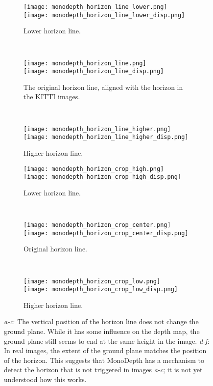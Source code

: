 \begin{figure}
\centering
\begin{subfigure}[t]{0.3\textwidth}
\texttt{[image: monodepth\_horizon\_line\_lower.png]}\\
\texttt{[image: monodepth\_horizon\_line\_lower\_disp.png]}
\caption{Lower horizon line.}
\end{subfigure}
~
\begin{subfigure}[t]{0.3\textwidth}
\texttt{[image: monodepth\_horizon\_line.png]}\\
\texttt{[image: monodepth\_horizon\_line\_disp.png]}
\caption{The original horizon line, aligned with the horizon in the KITTI images.}
\end{subfigure}
~
\begin{subfigure}[t]{0.3\textwidth}
\texttt{[image: monodepth\_horizon\_line\_higher.png]}\\
\texttt{[image: monodepth\_horizon\_line\_higher\_disp.png]}
\caption{Higher horizon line.}
\end{subfigure}

\begin{subfigure}[t]{0.3\textwidth}
\texttt{[image: monodepth\_horizon\_crop\_high.png]}\\
\texttt{[image: monodepth\_horizon\_crop\_high\_disp.png]}
\caption{Lower horizon line.}
\end{subfigure}
~
\begin{subfigure}[t]{0.3\textwidth}
\texttt{[image: monodepth\_horizon\_crop\_center.png]}\\
\texttt{[image: monodepth\_horizon\_crop\_center\_disp.png]}
\caption{Original horizon line.}
\end{subfigure}
~
\begin{subfigure}[t]{0.3\textwidth}
\texttt{[image: monodepth\_horizon\_crop\_low.png]}\\
\texttt{[image: monodepth\_horizon\_crop\_low\_disp.png]}
\caption{Higher horizon line.}
\end{subfigure}
\caption{\emph{a-c}: The vertical position of the horizon line does not change the ground plane. While it has some influence on the depth map, the ground plane still seems to end at the same height in the image.
\emph{d-f}: In real images, the extent of the ground plane matches the position of the horizon. This suggests that MonoDepth has a mechanism to detect the horizon that is not triggered in images \emph{a-c}; it is not yet understood how this works.}
\label{fig:monodepth_pitch}
\end{figure}

